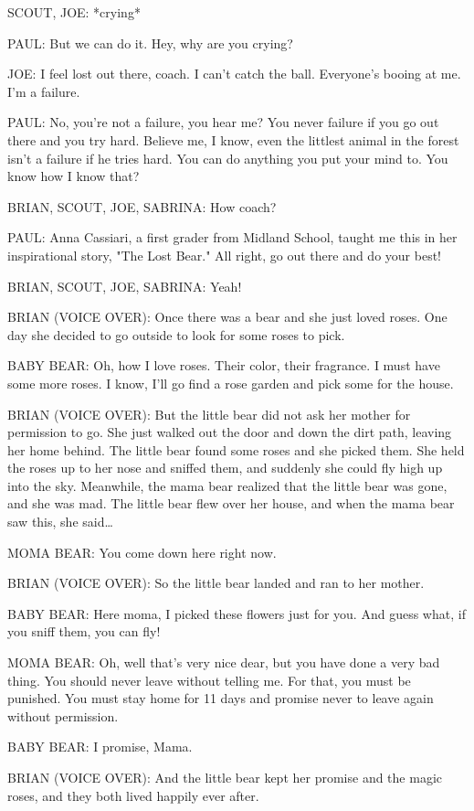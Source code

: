 SCOUT, JOE:
*crying*

PAUL:
But we can do it.
Hey, why are you crying?

JOE:
I feel lost out there, coach.
I can't catch the ball.
Everyone's booing at me.
I'm a failure.

PAUL:
No, you're not a failure, you hear me?
You never failure if you go out there and you try hard.
Believe me, I know, even the littlest animal in the forest isn't a failure if he tries hard.
You can do anything you put your mind to.
You know how I know that?

BRIAN, SCOUT, JOE, SABRINA:
How coach?

PAUL:
Anna Cassiari, a first grader from Midland School, taught me this in her inspirational story, "The Lost Bear."
All right, go out there and do your best!

BRIAN, SCOUT, JOE, SABRINA:
Yeah!

BRIAN (VOICE OVER):
Once there was a bear and she just loved roses.
One day she decided to go outside to look for some roses to pick.

BABY BEAR:
Oh, how I love roses.
Their color, their fragrance.
I must have some more roses.
I know, I'll go find a rose garden and pick some for the house.

BRIAN (VOICE OVER):
But the little bear did not ask her mother for permission to go.
She just walked out the door and down the dirt path, leaving her home behind.
The little bear found some roses and she picked them.
She held the roses up to her nose and sniffed them, and suddenly she could fly high up into the sky.
Meanwhile, the mama bear realized that the little bear was gone, and she was mad.
The little bear flew over her house, and when the mama bear saw this, she said\dots

MOMA BEAR:
You come down here right now.

BRIAN (VOICE OVER):
So the little bear landed and ran to her mother.

BABY BEAR:
Here moma, I picked these flowers just for you.
And guess what, if you sniff them, you can fly!

MOMA BEAR:
Oh, well that's very nice dear, but you have done a very bad thing.
You should never leave without telling me.
For that, you must be punished.
You must stay home for 11 days and promise never to leave again without permission.

BABY BEAR:
I promise, Mama.

BRIAN (VOICE OVER):
And the little bear kept her promise and the magic roses, and they both lived happily ever after.

